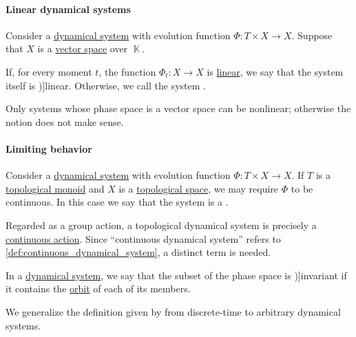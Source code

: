 \paragraph{Linear dynamical systems}

\begin{definition}\label{def:linear_dynamical_system}
  Consider a \hyperref[def:dynamical_system]{dynamical system} with evolution function \( \Phi: T \times X \to X \). Suppose that \( X \) is a \hyperref[def:vector_space]{vector space} over \( \BbbK \).

  If, for every moment \( t \), the function \( \Phi_t: X \to X \) is \hyperref[def:linear_function]{linear}, we say that the system itself is \term[ru=линейная (динамическая система) (\cite[11]{Юмагулов2015ДинамическиеСистемы})]{linear}. Otherwise, we call the system .
\end{definition}
\begin{comments}
  \item Only systems whose phase space is a vector space can be nonlinear; otherwise the notion does not make sense.
\end{comments}

\paragraph{Limiting behavior}

\begin{definition}\label{def:topological_dynamical_system}
  Consider a \hyperref[def:dynamical_system]{dynamical system} with evolution function \( \Phi: T \times X \to X \). If \( T \) is a \hyperref[def:topological_semigroup]{topological monoid} and \( X \) is a \hyperref[def:topological_space]{topological space}, we may require \( \Phi \) to be continuous. In this case we say that the system is a .
\end{definition}
\begin{comments}
  \item Regarded as a group action, a topological dynamical system is precisely a \hyperref[def:continuous_monoid_action]{continuous action}. Since \enquote{continuous dynamical system} refers to \cref{def:continuous_dynamical_system}, a distinct term is needed.
\end{comments}

\begin{definition}\label{def:dynamical_system_invariant_set}
  In a \hyperref[def:dynamical_system]{dynamical system}, we say that the subset of the phase space is \term[ru=инвариантное множество (\cite[94]{Юмагулов2015ДинамическиеСистемы})]{invariant} if it contains the \hyperref[def:dynamical_system_trajectory]{orbit} of each of its members.
\end{definition}
\begin{comments}
  \item We generalize the definition given by \textcite[94]{Юмагулов2015ДинамическиеСистемы} from discrete-time to arbitrary dynamical systems.
\end{comments}

